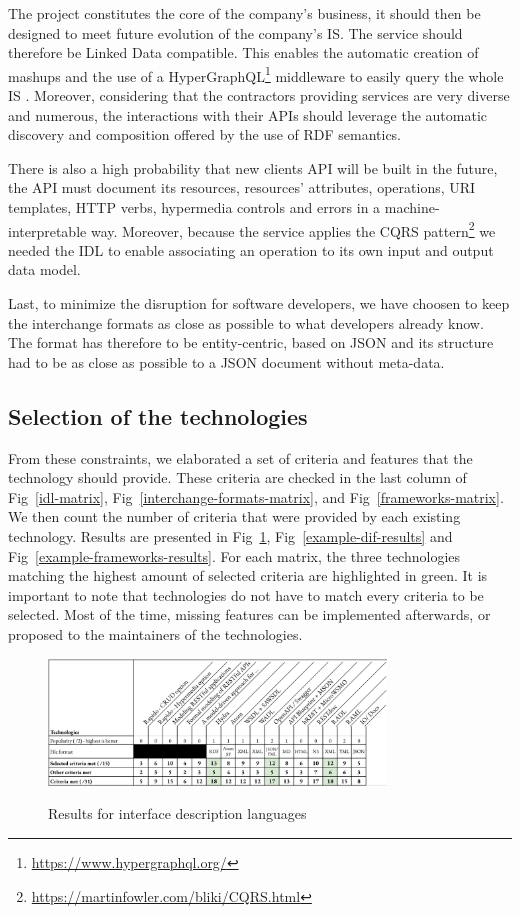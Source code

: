 The project constitutes the core of the company's business, it should then be designed to meet future evolution of the company's IS. 
The service should therefore be Linked Data compatible. This enables the automatic creation of mashups and the use of a HyperGraphQL\footnote{\url{https://www.hypergraphql.org/}} middleware to easily query the whole IS \cite{Tuchinda:2011:BMD:1993053.1993058}.
Moreover, considering that the contractors providing services are very diverse and numerous, the interactions with their APIs should leverage the automatic discovery and composition offered by the use of RDF semantics.

There is also a high probability that new clients API will be built in the future, the API must document its resources, resources' attributes, operations, URI templates, HTTP verbs, hypermedia controls and errors in a machine-interpretable way. Moreover, because the service applies the CQRS pattern\footnote{\url{https://martinfowler.com/bliki/CQRS.html}} we needed the IDL to enable associating an operation to its own input and output data model.

Last, to minimize the disruption for software developers, we have choosen to keep the interchange formats  as close as possible to what developers already know. The format has therefore to be entity-centric, based on JSON and its structure had to be as close as possible to a JSON document without meta-data.

\subsection{Selection of the technologies}

From these constraints, we elaborated a set of criteria and features that the technology should provide. These criteria are checked  in the last column  of Fig~\ref{idl-matrix}, Fig~\ref{interchange-formats-matrix}, and Fig~\ref{frameworks-matrix}. 
We then count the number of criteria that were provided by each existing technology. 
Results are presented in Fig~\ref{example-idl-results}, Fig~\ref{example-dif-results} and Fig~\ref{example-frameworks-results}. 
For each matrix, the three technologies matching the highest amount of selected criteria are highlighted in green.
It is important to note that technologies do not have to match every criteria to be selected.
Most of the time, missing features can be implemented afterwards, or proposed to the maintainers of the technologies.

\begin{figure}[ht]
\caption{Results for interface description languages}
\centering
\includegraphics[width=0.8\textwidth]{figures/example-idl-results.png}
\label{example-idl-results}
\end{figure}

